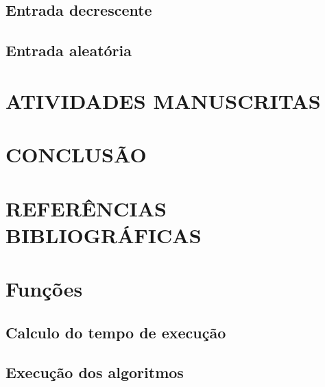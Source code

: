 \documentclass[12pt,a4paper]{article}
\begin{document}
\subsection{Entrada decrescente}


\subsection{Entrada aleatória}


\newpage


\section{ATIVIDADES MANUSCRITAS}


\newpage


\section{CONCLUSÃO}


\newpage


\section{REFERÊNCIAS BIBLIOGRÁFICAS}


\newpage

\section{Funções}

\subsection{Calculo do tempo de execução}


\newpage

\subsection{Execução dos algoritmos}

\end{document}
